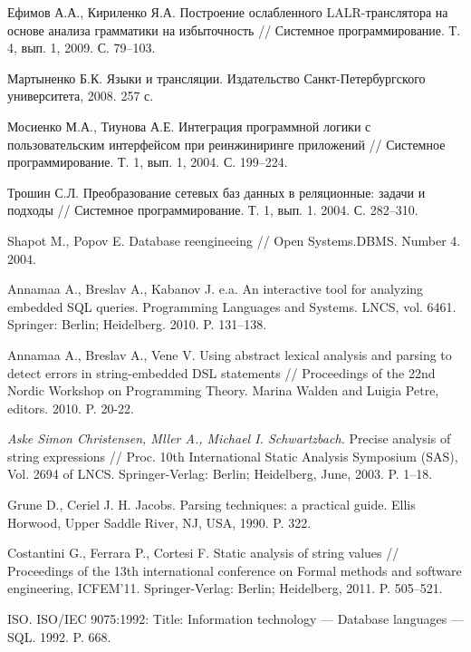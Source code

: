 \documentclass{llncs}
\begin{document}
%
%
\begin{thebibliography}{}
  
Ефимов А.А., Кириленко Я.А. Построение ослабленного LALR-транслятора на основе анализа грамматики на избыточность // Системное программирование. Т. 4, вып. 1, 2009. С. 79–103.  

Мартыненко Б.К. Языки и трансляции. Издательство Санкт-Петербургского университета, 2008. 257 с. 

Мосиенко М.А., Тиунова А.Е. Интеграция программной логики с пользовательским интерфейсом при реинжиниринге приложений // Системное программирование. Т. 1, вып. 1, 2004. С. 199–224.

Трошин С.Л. Преобразование сетевых баз данных в реляционные: задачи и подходы // Системное программирование. Т. 1, вып. 1. 2004. С. 282–310.

Shapot M., Popov E. Database reengineeing // Open Systems.DBMS. Number 4. 2004.    

Annamaa A., Breslav A., Kabanov J. e.a. An interactive tool for analyzing embedded SQL queries. Programming Languages and Systems. LNCS, vol. 6461. Springer: Berlin; Heidelberg. 2010. P. 131–138.

Annamaa A., Breslav A., Vene V. Using abstract lexical analysis and parsing to detect errors in string-embedded DSL statements // Proceedings of the 22nd Nordic Workshop on Programming Theory. Marina Walden and Luigia Petre, editors. 2010. P. 20-22.

\emph{Aske Simon Christensen, Mller A., Michael I. Schwartzbach.} Precise analysis of string expressions // Proc. 10th International Static Analysis Symposium (SAS), Vol. 2694 of LNCS. Springer-Verlag: Berlin; Heidelberg, June, 2003. P. 1–18.

Grune D., Ceriel J. H. Jacobs. Parsing techniques: a practical guide. Ellis Horwood, Upper Saddle River, NJ, USA, 1990. P. 322.

Costantini G., Ferrara P., Cortesi F. Static analysis of string values // Proceedings of the 13th international conference on Formal methods and software engineering, ICFEM’11. Springer-Verlag: Berlin; Heidelberg, 2011. P. 505–521.

ISO. ISO/IEC 9075:1992: Title: Information technology — Database languages — SQL. 1992. P. 668.


\end{thebibliography}
\end{document}
